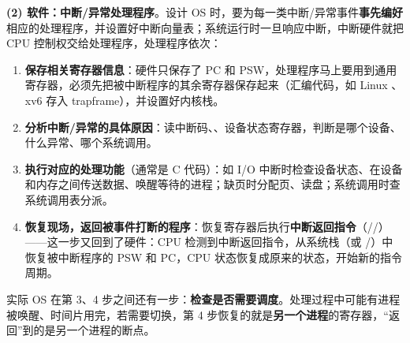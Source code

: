 \textbf{(2) 软件：中断/异常处理程序}。设计 OS 时，要为每一类中断/异常事件\textbf{事先编好}相应的处理程序，并设置好中断向量表；系统运行时一旦响应中断，中断硬件就把 CPU 控制权交给处理程序，处理程序依次：
\begin{enumerate}
    \item \textbf{保存相关寄存器信息}：硬件只保存了 PC 和 PSW，处理程序马上要用到通用寄存器，必须先把被中断程序的其余寄存器保存起来（汇编代码，如 Linux 、xv6  存入 trapframe），并设置好内核栈。
    \item \textbf{分析中断/异常的具体原因}：读中断码、、设备状态寄存器，判断是哪个设备、什么异常、哪个系统调用。
    \item \textbf{执行对应的处理功能}（通常是 C 代码）：如 I/O 中断时检查设备状态、在设备和内存之间传送数据、唤醒等待的进程；缺页时分配页、读盘；系统调用时查系统调用表分派。
    \item \textbf{恢复现场，返回被事件打断的程序}：恢复寄存器后执行\textbf{中断返回指令}（//）——这一步又回到了硬件：CPU 检测到中断返回指令，从系统栈（或 /）中恢复被中断程序的 PSW 和 PC，CPU 状态恢复成原来的状态，开始新的指令周期。
\end{enumerate}
\ez 实际 OS 在第 3、4 步之间还有一步：\textbf{检查是否需要调度}。处理过程中可能有进程被唤醒、时间片用完，若需要切换，第 4 步恢复的就是\textbf{另一个进程}的寄存器，“返回”到的是另一个进程的断点。

